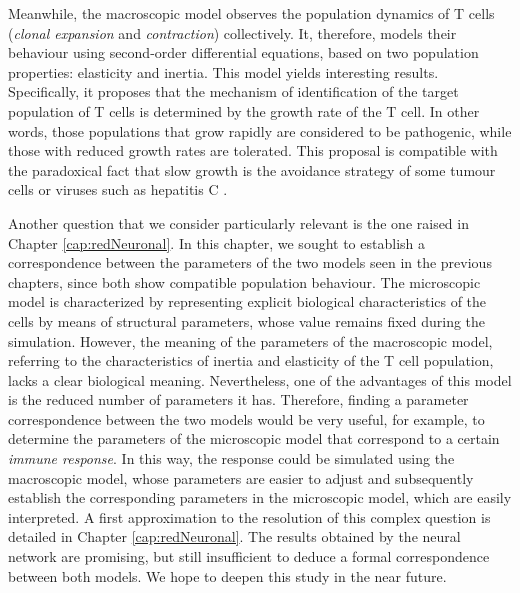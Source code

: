 Meanwhile, the macroscopic model observes the population dynamics of T cells (\textit{clonal expansion} and \textit{contraction}) collectively. It, therefore, models their behaviour using second-order differential equations, based on two population properties: elasticity and inertia. This model yields interesting results. Specifically, it proposes that the mechanism of identification of the target population of T cells is determined by the growth rate of the T cell. In other words, those populations that grow rapidly are considered to be pathogenic, while those with reduced growth rates are tolerated. This proposal is compatible with the paradoxical fact that slow growth is the avoidance strategy of some tumour cells or viruses such as hepatitis C \citep{arias2015growth}.


Another question that we consider particularly relevant is the one raised in Chapter \ref{cap:redNeuronal}. In this chapter, we sought to establish a correspondence between the parameters of the two models seen in the previous chapters, since both show compatible population behaviour. The microscopic model is characterized by representing explicit biological characteristics of the cells by means of structural parameters, whose value remains fixed during the simulation. However, the meaning of the parameters of the macroscopic model, referring to the characteristics of inertia and elasticity of the T cell population, lacks a clear biological meaning. Nevertheless, one of the advantages of this model is the reduced number of parameters it has. Therefore, finding a parameter correspondence between the two models would be very useful, for example, to determine the parameters of the microscopic model that correspond to a certain \textit{immune response}. In this way, the response could be simulated using the macroscopic model, whose parameters are easier to adjust and subsequently establish the corresponding parameters in the microscopic model, which are easily interpreted. A first approximation to the resolution of this complex question is detailed in Chapter \ref{cap:redNeuronal}. The results obtained by the neural network are promising, but still insufficient to deduce a formal correspondence between both models. We hope to deepen this study in the near future.


